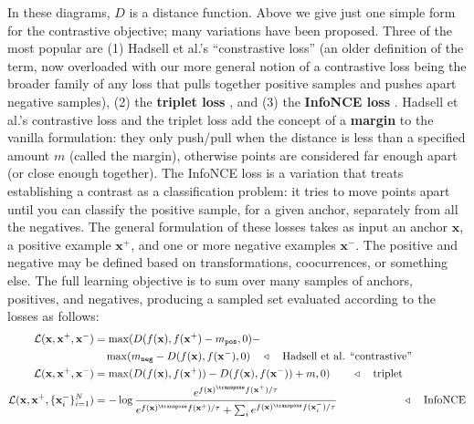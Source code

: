 In these diagrams, $D$ is a distance function. Above we give just one simple form for the contrastive objective; many variations have been proposed. Three of the most popular are (1) Hadsell et al.'s ``constrastive loss'' \cite{hadsell2006dimensionality} (an older definition of the term, now overloaded with our more general notion of a contrastive loss being the broader family of any loss that pulls together positive samples and pushes apart negative samples), (2) the \textbf{triplet loss} \cite{chechik2010large}, and (3) the \textbf{InfoNCE loss} \cite{oord2018representation}. Hadsell et al.'s contrastive loss and the triplet loss add the concept of a \textbf{margin} to the vanilla formulation: they only push/pull when the distance is less than a specified amount $m$ (called the margin), otherwise points are considered far enough apart (or close enough together). The InfoNCE loss is a variation that treats establishing a contrast as a classification problem: it tries to move points apart until you can classify the positive sample, for a given anchor, separately from all the negatives. The general formulation of these losses takes as input an anchor $\mathbf{x}$, a positive example $\mathbf{x}^+$, and one or more negative examples $\mathbf{x}^-$. The positive and negative may be defined based on transformations, coocurrences, or something else. The full learning objective is to sum over many samples of anchors, positives, and negatives, producing a sampled set evaluated according to the losses as follows:
\begin{align}
    \mathcal{L}(\mathbf{x}, \mathbf{x}^+, \mathbf{x}^-)               & = \max(D(f(\mathbf{x}), f(\mathbf{x}^+)-m_{\texttt{pos}},0) - \nonumber                                                                                                                                                                                                                       \\ &\quad \max(m_{\texttt{neg}} - D(f(\mathbf{x}), f(\mathbf{x}^-),0) \quad \triangleleft \quad \text{Hadsell et al. ``contrastive''}\\
    \mathcal{L}(\mathbf{x}, \mathbf{x}^+, \mathbf{x}^-)               & = \max(D(f(\mathbf{x}), f(\mathbf{x}^+)) - D(f(\mathbf{x}), f(\mathbf{x}^-)) + m, 0) \quad\quad \triangleleft \quad \text{triplet}                                                                                                                                                            \\
    \mathcal{L}(\mathbf{x}, \mathbf{x}^+, \{\mathbf{x}_i^-\}_{i=1}^N) & = -\log \frac{e^{f(\mathbf{x})^\transpose f(\mathbf{x}^+)/\tau}}{e^{f(\mathbf{x})^\transpose f(\mathbf{x}^+)/\tau} + \sum_i e^{f(\mathbf{x})^\transpose f(\mathbf{x}_i^-)/\tau}} \quad\quad\quad\quad\quad\quad\triangleleft \quad \text{InfoNCE} \label{eqn:representation_learning:infonce}
\end{align}

